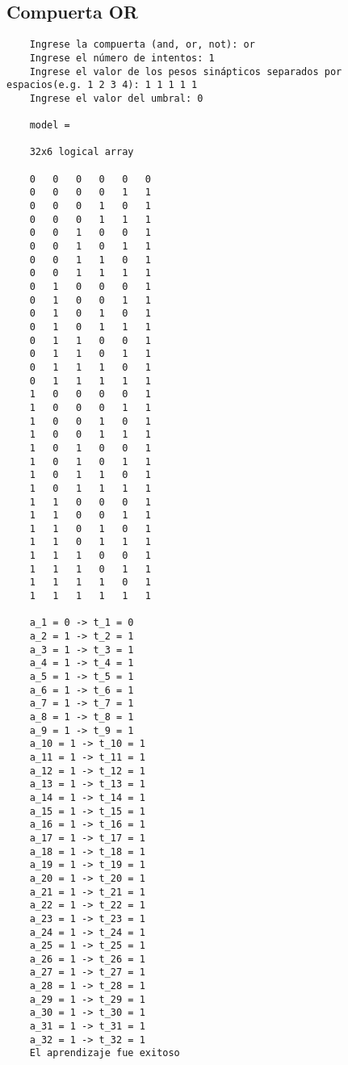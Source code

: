 \documentclass{article}
\begin{document}
\subsection{Compuerta OR}
\begin{lstlisting}
	Ingrese la compuerta (and, or, not): or
	Ingrese el número de intentos: 1
	Ingrese el valor de los pesos sinápticos separados por espacios(e.g. 1 2 3 4): 1 1 1 1 1
	Ingrese el valor del umbral: 0
	
	model =
	
	32x6 logical array
	
	0   0   0   0   0   0
	0   0   0   0   1   1
	0   0   0   1   0   1
	0   0   0   1   1   1
	0   0   1   0   0   1
	0   0   1   0   1   1
	0   0   1   1   0   1
	0   0   1   1   1   1
	0   1   0   0   0   1
	0   1   0   0   1   1
	0   1   0   1   0   1
	0   1   0   1   1   1
	0   1   1   0   0   1
	0   1   1   0   1   1
	0   1   1   1   0   1
	0   1   1   1   1   1
	1   0   0   0   0   1
	1   0   0   0   1   1
	1   0   0   1   0   1
	1   0   0   1   1   1
	1   0   1   0   0   1
	1   0   1   0   1   1
	1   0   1   1   0   1
	1   0   1   1   1   1
	1   1   0   0   0   1
	1   1   0   0   1   1
	1   1   0   1   0   1
	1   1   0   1   1   1
	1   1   1   0   0   1
	1   1   1   0   1   1
	1   1   1   1   0   1
	1   1   1   1   1   1
	
	a_1 = 0 -> t_1 = 0
	a_2 = 1 -> t_2 = 1
	a_3 = 1 -> t_3 = 1
	a_4 = 1 -> t_4 = 1
	a_5 = 1 -> t_5 = 1
	a_6 = 1 -> t_6 = 1
	a_7 = 1 -> t_7 = 1
	a_8 = 1 -> t_8 = 1
	a_9 = 1 -> t_9 = 1
	a_10 = 1 -> t_10 = 1
	a_11 = 1 -> t_11 = 1
	a_12 = 1 -> t_12 = 1
	a_13 = 1 -> t_13 = 1
	a_14 = 1 -> t_14 = 1
	a_15 = 1 -> t_15 = 1
	a_16 = 1 -> t_16 = 1
	a_17 = 1 -> t_17 = 1
	a_18 = 1 -> t_18 = 1
	a_19 = 1 -> t_19 = 1
	a_20 = 1 -> t_20 = 1
	a_21 = 1 -> t_21 = 1
	a_22 = 1 -> t_22 = 1
	a_23 = 1 -> t_23 = 1
	a_24 = 1 -> t_24 = 1
	a_25 = 1 -> t_25 = 1
	a_26 = 1 -> t_26 = 1
	a_27 = 1 -> t_27 = 1
	a_28 = 1 -> t_28 = 1
	a_29 = 1 -> t_29 = 1
	a_30 = 1 -> t_30 = 1
	a_31 = 1 -> t_31 = 1
	a_32 = 1 -> t_32 = 1
	El aprendizaje fue exitoso
\end{lstlisting}
\end{document}
